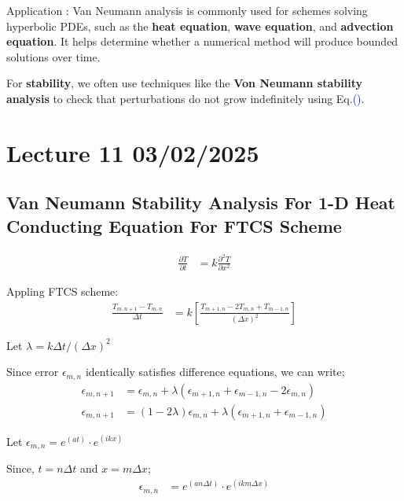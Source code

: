 \documentclass[fleqn,10pt]{SelfArx} %
\newcommand{\myeqref}[1]{Eq.\textcolor{blue}{\textup{(\getrefnumber{#1})}}}
\begin{document}
Application : Van Neumann analysis is commonly used for schemes solving hyperbolic PDEs, such as the \textbf{heat equation}, \textbf{wave equation}, and \textbf{advection equation}. It helps determine whether a numerical method will produce bounded solutions over time.

For \textbf{stability}, we often use techniques like the \textbf{Von Neumann stability analysis} to check that perturbations do not grow indefinitely using \myeqref{eq:vanneumann}.

\clearpage

\section{Lecture 11 03/02/2025}
\subsection{Van Neumann Stability Analysis For 1-D Heat Conducting Equation For FTCS Scheme}
\begin{align*}
	\frac{\partial T}{\partial t} &= k\frac{\partial^2 T}{\partial x^2} \tag{11.1} \label{eq:1dheateq}
\end{align*}

Appling FTCS scheme:
\begin{align*}
	\frac{T_{m,n+1} - T_{m,n}}{\Delta t} &= k\left[\frac{T_{m+1,n} - 2T_{m,n} + T_{m-1,n}}{(\Delta x)^2}\right] \tag{11.2} \label{eq:1dheatftcseq}
\end{align*}

Let $\lambda = k \Delta t / (\Delta x)^2$

Since error $\epsilon_{m,n}$ identically satisfies difference equations, we can write;
\begin{align*}
	\epsilon_{m,n+1} &= \epsilon_{m,n} + \lambda \left(\epsilon_{m+1,n} + \epsilon_{m-1,n} -2 \epsilon_{m,n}\right) \\
	\epsilon_{m,n+1} &= \left(1-2\lambda \right)\epsilon_{m,n} + \lambda \left(\epsilon_{m+1,n} + \epsilon_{m-1,n} \right) \tag{11.3} \label{eq:11.3}
\end{align*}

Let \( \epsilon_{m,n} = e^{(at)} \cdot e^{(ikx)} \)

Since, \( t = n \Delta t \) and \( x = m \Delta x \);
\begin{align*}
	\epsilon_{m,n} &= e^{(an \Delta t)} \cdot e^{(ik m \Delta x)} \tag{11.4} \label{eq:11.4}
\end{align*}
\end{document}
